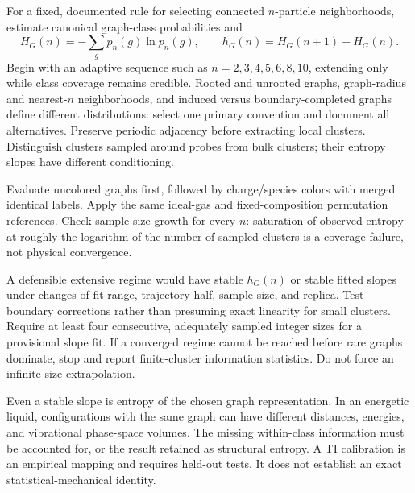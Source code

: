 \documentclass[11pt,a4paper]{article}
\begin{document}
For a fixed, documented rule for selecting connected $n$-particle neighborhoods,
estimate canonical graph-class probabilities and
\begin{equation}
H_G(n)=-\sum_g p_n(g)\ln p_n(g),\qquad
h_G(n)=H_G(n+1)-H_G(n).
\end{equation}
Begin with an adaptive sequence such as $n=2,3,4,5,6,8,10$, extending only
while class coverage remains credible. Rooted and unrooted graphs, graph-radius
and nearest-$n$ neighborhoods, and induced versus boundary-completed graphs
define different distributions: select one primary convention and document
all alternatives. Preserve periodic adjacency before extracting local clusters.
Distinguish clusters sampled around probes from bulk clusters; their entropy
slopes have different conditioning.

Evaluate uncolored graphs first, followed by charge/species colors with merged
identical labels. Apply the same ideal-gas and fixed-composition permutation
references. Check sample-size growth for every $n$: saturation of observed
entropy at roughly the logarithm of the number of sampled clusters is a
coverage failure, not physical convergence.

A defensible extensive regime would have stable $h_G(n)$ or stable fitted
slopes under changes of fit range, trajectory half, sample size, and replica.
Test boundary corrections rather than presuming exact linearity for small
clusters. Require at least four consecutive, adequately sampled integer sizes
for a provisional slope fit. If a converged regime cannot be reached before
rare graphs dominate, stop and report finite-cluster information statistics.
Do not force an infinite-size extrapolation.

Even a stable slope is entropy of the chosen graph representation. In an
energetic liquid, configurations with the same graph can have different
distances, energies, and vibrational phase-space volumes. The missing
within-class information must be accounted for, or the result retained as
structural entropy. A TI calibration is an empirical mapping and requires
held-out tests. It does not establish an exact statistical-mechanical identity.
\end{document}
